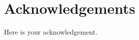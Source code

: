 \chapter*{Acknowledgements}
Here is your acknowledgement.
\begin{flushright}
  \submitdate\\
  \myname
\end{flushright}
